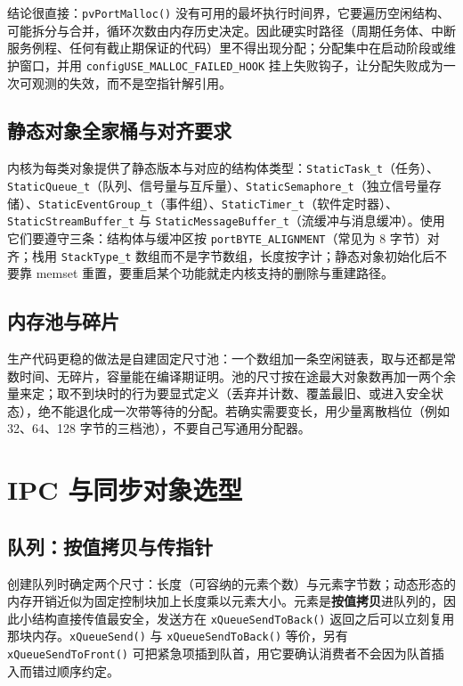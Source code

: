 \documentclass[12pt,a4paper,fontset=fandol]{ctexbook}
\newcommand{\Fn}[1]{\texttt{#1()}}
\newcommand{\Tp}[1]{\texttt{#1}}
\begin{document}
结论很直接：\Fn{pvPortMalloc} 没有可用的最坏执行时间界，它要遍历空闲结构、可能拆分与合并，循环次数由内存历史决定。因此硬实时路径（周期任务体、中断服务例程、任何有截止期保证的代码）里不得出现分配；分配集中在启动阶段或维护窗口，并用 \Tp{configUSE\_MALLOC\_FAILED\_HOOK} 挂上失败钩子，让分配失败成为一次可观测的失效，而不是空指针解引用。

\subsection{静态对象全家桶与对齐要求}

内核为每类对象提供了静态版本与对应的结构体类型：\Tp{StaticTask\_t}（任务）、\Tp{StaticQueue\_t}（队列、信号量与互斥量）、\Tp{StaticSemaphore\_t}（独立信号量存储）、\Tp{StaticEventGroup\_t}（事件组）、\Tp{StaticTimer\_t}（软件定时器）、\Tp{StaticStreamBuffer\_t} 与 \Tp{StaticMessageBuffer\_t}（流缓冲与消息缓冲）。使用它们要遵守三条：结构体与缓冲区按 \Tp{portBYTE\_ALIGNMENT}（常见为 8 字节）对齐；栈用 \Tp{StackType\_t} 数组而不是字节数组，长度按字计；静态对象初始化后不要靠 memset 重置，要重启某个功能就走内核支持的删除与重建路径。

\subsection{内存池与碎片}

生产代码更稳的做法是自建固定尺寸池：一个数组加一条空闲链表，取与还都是常数时间、无碎片，容量能在编译期证明。池的尺寸按在途最大对象数再加一两个余量来定；取不到块时的行为要显式定义（丢弃并计数、覆盖最旧、或进入安全状态），绝不能退化成一次带等待的分配。若确实需要变长，用少量离散档位（例如 32、64、128 字节的三档池），不要自己写通用分配器。

\section{IPC 与同步对象选型}

\subsection{队列：按值拷贝与传指针}

创建队列时确定两个尺寸：长度（可容纳的元素个数）与元素字节数；动态形态的内存开销近似为固定控制块加上长度乘以元素大小。元素是\textbf{按值拷贝}进队列的，因此小结构直接传值最安全，发送方在 \Fn{xQueueSendToBack} 返回之后可以立刻复用那块内存。\Fn{xQueueSend} 与 \Fn{xQueueSendToBack} 等价，另有 \Fn{xQueueSendToFront} 可把紧急项插到队首，用它要确认消费者不会因为队首插入而错过顺序约定。
\end{document}
